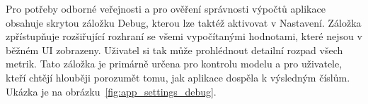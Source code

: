 Pro potřeby odborné veřejnosti a pro ověření správnosti výpočtů aplikace obsahuje skrytou záložku Debug, kterou lze taktéž aktivovat v Nastavení. Záložka zpřístupňuje rozšiřující rozhraní se všemi vypočítanými hodnotami, které nejsou v běžném UI zobrazeny. Uživatel si tak může prohlédnout detailní rozpad všech metrik. Tato záložka je primárně určena pro kontrolu modelu a pro uživatele, kteří chtějí hlouběji porozumět tomu, jak aplikace dospěla k výsledným číslům. Ukázka je na obrázku~\ref{fig:app_settings_debug}.
